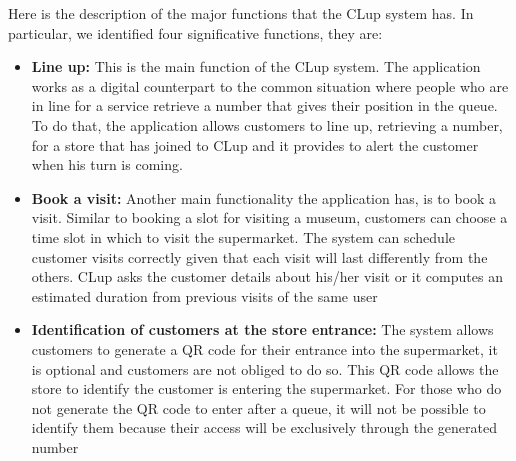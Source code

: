 Here is the description of the major functions that the CLup system has. In particular, we identified four significative functions, they are:
\begin{itemize}
    \item \textbf{Line up:} This is the main function of the CLup system. The application works as a digital counterpart to the common situation where people who are in line for a service retrieve a number that gives their position in the queue. \newline To do that, the application allows customers to line up, retrieving a number, for a store that has joined to CLup and it provides to alert the customer when his turn is coming.
    \item \textbf{Book a visit:} Another main functionality the application has, is to book a visit. Similar to booking a slot for visiting a museum, customers can choose a time slot in which to visit the supermarket. The system can schedule customer visits correctly given that each visit will last differently from the others. CLup asks the customer details about his/her visit or it computes an estimated duration from previous visits of the same user
    \item \textbf{Identification of customers at the store entrance:} The system allows customers to generate a QR code for their entrance into the supermarket, it is optional and customers are not obliged to do so. This QR code allows the store to identify the customer is entering the supermarket. For those who do not generate the QR code to enter after a queue, it will not be possible to identify them because their access will be exclusively through the generated number
\end{itemize}